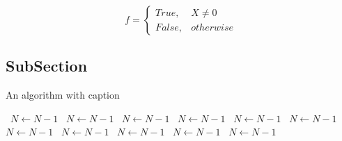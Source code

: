 \documentclass[a4paper]{article}
\begin{document}
\begin{equation}   f =
\begin{cases} True, & X \neq 0\\
False, & otherwise
\end{cases}
\end{equation}

\subsection{SubSection}

\begin{algorithm}
\caption{An algorithm with caption}
\begin{algorithmic}
\    \State $N \gets N - 1$
\    \State $N \gets N - 1$
\    \State $N \gets N - 1$
\    \State $N \gets N - 1$
\    \State $N \gets N - 1$
\    \State $N \gets N - 1$
\    \State $N \gets N - 1$
\    \State $N \gets N - 1$
\    \State $N \gets N - 1$
\    \State $N \gets N - 1$
\    \State $N \gets N - 1$
\EndWhile
\end{algorithmic}
\end{algorithm}
\end{document}
